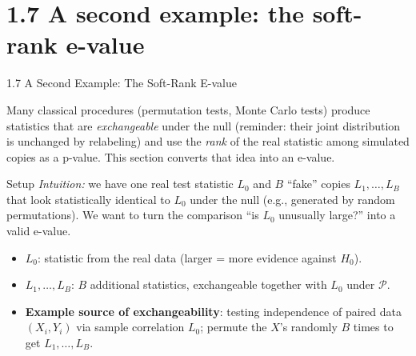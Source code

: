\documentclass[aspectratio=169,10pt]{beamer}
\begin{document}
\section{1.7 A second example: the soft-rank e-value}

\begin{frame}{1.7 A Second Example: The Soft-Rank E-value}

Many classical procedures (permutation tests, Monte Carlo tests) produce
statistics that are \emph{exchangeable} under the null (reminder: their
joint distribution is unchanged by relabeling) and use the \emph{rank} of
the real statistic among simulated copies as a p-value. This section
converts that idea into an e-value.

\begin{block}{Setup}
\emph{Intuition:} we have one real test statistic $L_0$ and $B$
``fake'' copies $L_1,\dots,L_B$ that look statistically identical to $L_0$
under the null (e.g., generated by random permutations). We want to turn
the comparison ``is $L_0$ unusually large?'' into a valid e-value.
\begin{itemize}
  \item $L_0$: statistic from the real data (larger = more evidence
    against $H_0$).
  \item $L_1,\dots,L_B$: $B$ additional statistics, exchangeable together
    with $L_0$ under $\mathcal{P}$.
  \item \textbf{Example source of exchangeability}: testing independence
    of paired data $(X_i,Y_i)$ via sample correlation $L_0$; permute the
    $X$'s randomly $B$ times to get $L_1,\dots,L_B$.
\end{itemize}
\end{block}

\end{frame}
\end{document}
